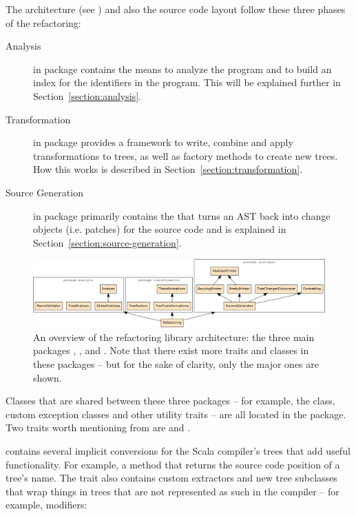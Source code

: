 The architecture (see ) and also the source code layout follow these three phases of the refactoring:

\begin{description}
 \item[Analysis] in package  contains the means to analyze the program and to build an index for the identifiers in the program. This will be explained further in Section~\vref{section:analysis}.
 \item[Transformation] in package  provides a framework to write, combine and apply transformations to trees, as well as factory methods to create new trees. How this works is described in Section~\vref{section:transformation}.
 \item[Source Generation] in package  primarily contains the  that turns an AST back into change objects (i.e. patches) for the source code and is explained in Section~\vref{section:source-generation}.
\end{description}

\begin{figure}
  \centering
  \includegraphics[width=\linewidth]{refactoring-architecture.pdf}
  \caption{An overview of the refactoring library architecture: the three main packages , , and . Note that there exist more traits and classes in these packages -- but for the sake of clarity, only the major ones are shown.}
  \label{figure:refactoring-architecture}
\end{figure}

Classes that are shared between these three packages -- for example, the  class, custom exception classes and other utility traits -- are all located in the  package. Two traits worth mentioning from  are  and .

 contains several implicit conversions for the Scala compiler's trees that add useful functionality. For example, a  method that returns the source code position of a tree's name. The trait also contains custom extractors and new tree subclasses that wrap things in trees that are not represented as such in the compiler -- for example, modifiers:

